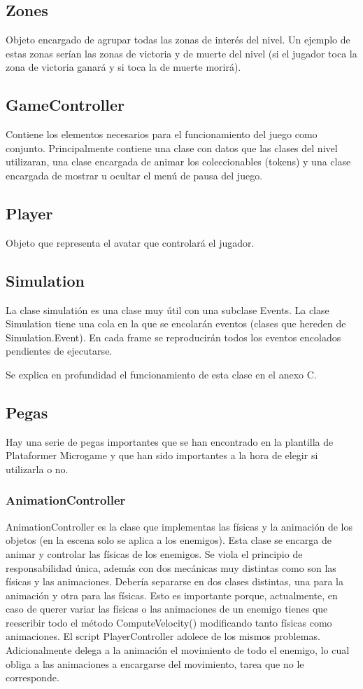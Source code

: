\subsection{Zones}
Objeto encargado de agrupar todas las zonas de interés del nivel. Un ejemplo de estas zonas serían las zonas de victoria y de muerte del nivel (si el jugador toca la zona de victoria ganará y si toca la de muerte morirá).

\subsection{GameController}
Contiene los elementos necesarios para el funcionamiento del juego como conjunto. Principalmente contiene una clase con datos que las clases del nivel utilizaran, una clase encargada de animar los coleccionables (tokens) y una clase encargada de mostrar u ocultar el menú de pausa del juego.

\subsection{Player}
Objeto que representa el avatar que controlará el jugador.

\subsection{Simulation}
La clase simulatión es una clase muy útil con una subclase Events. La clase Simulation tiene una cola en la que se encolarán eventos (clases que hereden de Simulation.Event). En cada frame se reproducirán todos los eventos encolados pendientes de ejecutarse.

Se explica en profundidad el funcionamiento de esta clase en el anexo C.

\subsection{Pegas}
Hay una serie de pegas importantes que se han encontrado en la plantilla de Plataformer Microgame y que han sido importantes a la hora de elegir si utilizarla o no.

\subsubsection{AnimationController}
AnimationController es la clase que implementas las físicas y la animación de los objetos (en la escena solo se aplica a los enemigos).
Esta clase se encarga de animar y controlar las físicas de los enemigos. Se viola el principio de responsabilidad única, además con dos mecánicas muy distintas como son las físicas y las animaciones. Debería separarse en dos clases distintas, una para la animación y otra para las físicas. Esto es importante porque, actualmente, en caso de querer variar las físicas o las animaciones de un enemigo tienes que reescribir todo el método ComputeVelocity() modificando tanto físicas como animaciones. El script PlayerController adolece de los mismos problemas. 
Adicionalmente delega a la animación el movimiento de todo el enemigo, lo cual obliga a las animaciones a encargarse del movimiento, tarea que no le corresponde.

